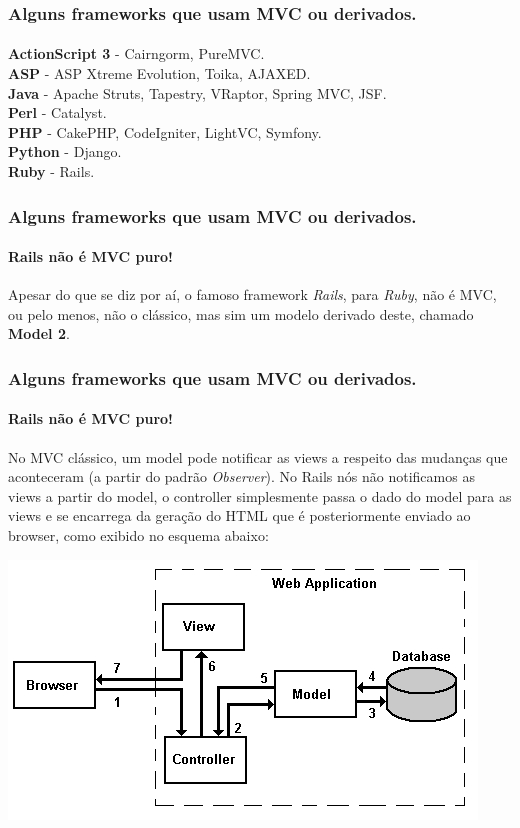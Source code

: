 \documentclass{beamer}
\begin{document}
\begin{frame}
\frametitle{Alguns frameworks que usam MVC ou derivados.}
\framesubtitle{}
	\textbf{ActionScript 3} - Cairngorm, PureMVC.\\
	\textbf{ASP} - ASP Xtreme Evolution, Toika, AJAXED.\\
	\textbf{Java} - Apache Struts, Tapestry, VRaptor, Spring MVC, JSF.\\
	\textbf{Perl} - Catalyst.\\
	\textbf{PHP} - CakePHP, CodeIgniter, LightVC, Symfony.\\
	\textbf{Python} - Django.\\
	\textbf{Ruby} - Rails.
\end{frame}

\begin{frame}
\frametitle{Alguns frameworks que usam MVC ou derivados.}
\framesubtitle{Rails não é MVC puro!}
	Apesar do que se diz por aí, o famoso framework \textit{Rails}, para \textit{Ruby}, não é MVC, ou pelo menos, não o clássico, 
	mas sim um modelo derivado deste, chamado \textbf{Model 2}.
\end{frame}

\begin{frame}
\frametitle{Alguns frameworks que usam MVC ou derivados.}
\framesubtitle{Rails não é MVC puro!}
	No MVC clássico, um model pode notificar as views a respeito das mudanças que aconteceram (a partir do padrão \textit{Observer}). No Rails
	nós não notificamos as views a partir do model, o controller simplesmente passa o dado do model para as views e se encarrega da geração do HTML que 
	é posteriormente enviado ao browser, como exibido no esquema abaixo:
	\begin{center}
		\includegraphics[scale=0.4]{RailsMVC.jpg}
	\end{center} 
\end{frame}
\end{document}
